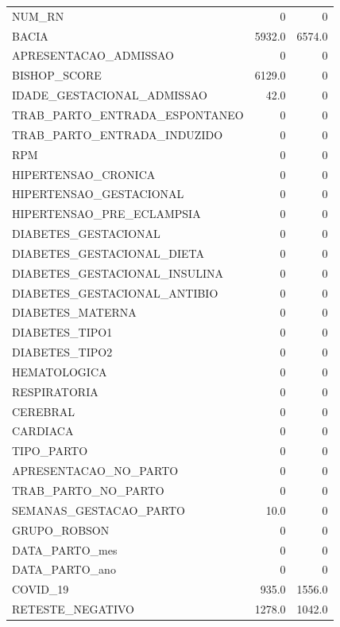 \documentclass{article}
\begin{document}
\begin{longtable}{lrr}
                        NUM\_RN &       0 &         0 \\
                         BACIA &  5932.0 &    6574.0 \\
         APRESENTACAO\_ADMISSAO &       0 &         0 \\
                  BISHOP\_SCORE &  6129.0 &         0 \\
    IDADE\_GESTACIONAL\_ADMISSAO &    42.0 &         0 \\
 TRAB\_PARTO\_ENTRADA\_ESPONTANEO &       0 &         0 \\
   TRAB\_PARTO\_ENTRADA\_INDUZIDO &       0 &         0 \\
                           RPM &       0 &         0 \\
           HIPERTENSAO\_CRONICA &       0 &         0 \\
       HIPERTENSAO\_GESTACIONAL &       0 &         0 \\
     HIPERTENSAO\_PRE\_ECLAMPSIA &       0 &         0 \\
          DIABETES\_GESTACIONAL &       0 &         0 \\
    DIABETES\_GESTACIONAL\_DIETA &       0 &         0 \\
 DIABETES\_GESTACIONAL\_INSULINA &       0 &         0 \\
  DIABETES\_GESTACIONAL\_ANTIBIO &       0 &         0 \\
              DIABETES\_MATERNA &       0 &         0 \\
                DIABETES\_TIPO1 &       0 &         0 \\
                DIABETES\_TIPO2 &       0 &         0 \\
                  HEMATOLOGICA &       0 &         0 \\
                  RESPIRATORIA &       0 &         0 \\
                      CEREBRAL &       0 &         0 \\
                      CARDIACA &       0 &         0 \\
                    TIPO\_PARTO &       0 &         0 \\
         APRESENTACAO\_NO\_PARTO &       0 &         0 \\
           TRAB\_PARTO\_NO\_PARTO &       0 &         0 \\
        SEMANAS\_GESTACAO\_PARTO &    10.0 &         0 \\
                  GRUPO\_ROBSON &       0 &         0 \\
                DATA\_PARTO\_mes &       0 &         0 \\
                DATA\_PARTO\_ano &       0 &         0 \\
                      COVID\_19 &   935.0 &    1556.0 \\
              RETESTE\_NEGATIVO &  1278.0 &    1042.0 \\
\end{longtable}
\\
\end{document}
